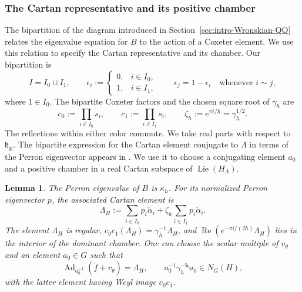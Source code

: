 \documentclass[11pt,leqno]{amsart}
\numberwithin{equation}{section}
\theoremstyle{plain}
\newtheorem{lemma}[theorem]{Lemma}
\theoremstyle{definition}
\theoremstyle{plain}
\theoremstyle{definition}
\theoremstyle{remark}
\newcommand{\gh}{\mathfrak h}
\begin{document}
\subsubsection{The Cartan representative and its positive chamber}
The bipartition of the diagram introduced in Section~\ref{sec:intro-Wronskian-QQ} relates the eigenvalue equation for $B$ to the action of a Coxeter element.  We use this relation to specify the Cartan representative and its chamber.  Our bipartition is
\begin{equation}\label{eq:fixed-bipartition}
 I=I_0\sqcup I_1,
 \qquad
 \epsilon_i:=
 \begin{cases}
 0,&i\in I_0,\\
 1,&i\in I_1,
 \end{cases}
 \qquad
 \epsilon_j=1-\epsilon_i\quad\text{whenever }i\sim j,
\end{equation}
where $1\in I_0$.
The bipartite Coxeter factors and the chosen square root of $\gamma_h$ are
\[
 c_0:=\prod_{i\in I_0}s_i,\qquad
 c_1:=\prod_{i\in I_1}s_i,\qquad
 \zeta_h:=e^{\pi i/h}=\gamma_h^{1/2}.
\]
The reflections within either color commute.  We take real parts with respect to $\gh_{\mathbb R}$.  The bipartite expression for the Cartan element conjugate to $\Lambda$ in terms of the Perron eigenvector appears in \cite[equations~(3.5)--(3.7), Remark~3.2 and Lemma~3.3]{MRV2016}.  We use it to choose a conjugating element $a_0$ and a positive chamber in a real Cartan subspace of $\operatorname{Lie}(H_\Lambda)$.
\begin{lemma}\label{lem:bipartite-Coxeter-identification}
The Perron eigenvalue of $B$ is $\kappa_h$.  For its normalized Perron eigenvector $p$, the associated Cartan element is
\begin{equation}\label{eq:cyclic-Cartan-PF-vector}
 \Lambda_H
 :=\sum_{i\in I_0}p_i\check\alpha_i
   +\zeta_h\sum_{i\in I_1}p_i\check\alpha_i.
\end{equation}
The element $\Lambda_H$ is regular, $c_0c_1(\Lambda_H)=\gamma_h^{-1}\Lambda_H$, and $\operatorname{Re}(e^{-\pi i/(2h)}\Lambda_H)$ lies in the interior of the dominant chamber.  One can choose the scalar multiple of $v_\theta$ and an element $a_0\in G$ such that
\[
 \operatorname{Ad}_{a_0^{-1}}(\mathring f+v_\theta)=\Lambda_H,
 \qquad
 a_0^{-1}\gamma_h^{-\mathbf h}a_0\in N_G(H),
\]
with the latter element having Weyl image $c_0c_1$.
\end{lemma}
\end{document}
